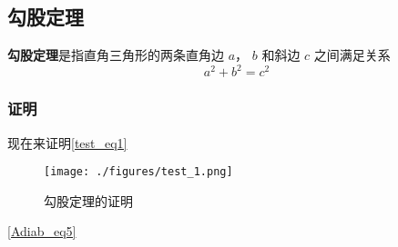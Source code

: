 
\subsection{勾股定理}
\textbf{勾股定理}是指直角三角形的两条直角边 $a$， $b$ 和斜边 $c$ 之间满足关系
\begin{equation}\label{test_eq1}
a^2 + b^2 = c^2
\end{equation}

\subsubsection{证明}
现在来证明\autoref{test_eq1}

\begin{figure}[ht]
\centering
\texttt{[image: ./figures/test\_1.png]}
\caption{勾股定理的证明} \label{test_fig1}
\end{figure}

\autoref{Adiab_eq5}
